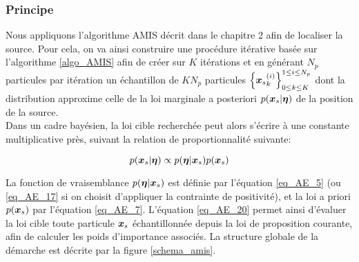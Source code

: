 {\subsubsection{Principe}

Nous appliquons l'algorithme AMIS décrit dans le chapitre 2 afin de localiser la source. Pour cela, on va ainsi construire une procédure itérative basée sur l'algorithme \ref{algo_AMIS} afin de créer sur $K$ itérations et en générant $N_p$ particules par itération un échantillon de $KN_p$ particules {$\left\{{\bm{x}_s}_k^{(i)}\right\}_{0\leq k \leq K}^{1\leq i \leq N_p}$} dont la distribution approxime celle de la loi marginale a posteriori {$p({\bm{x}_s} | {\bm{\eta}})$} de la position de la source.\\

\newpage Dans un cadre bayésien, la loi cible recherchée peut alors s'écrire à une constante multiplicative près, suivant la relation de proportionnalité suivante:

\begin{equation}
{
p({\bm{x}_s}| {\bm{\eta}}) \propto p({\bm{\eta}}| {\bm{x}_s})p({\bm{x}_s})
\label{eq_AE_20}
}
\end{equation}

La fonction de vraisemblance {$p({\bm{\eta}} | {\bm{x}_s})$} est définie par l'équation \eqref{eq_AE_5} (ou \eqref{eq_AE_17} si on choisit d'appliquer la contrainte de positivité), et la loi a priori {$p({\bm{x}_s})$} par l'équation \eqref{eq_AE_7}. L'équation \eqref{eq_AE_20} permet ainsi d'évaluer la loi cible toute particule {${\bm{x}_s}$} échantillonnée depuis la loi de proposition courante, afin de calculer les poids d'importance {associés}. La structure globale de la démarche est décrite par la figure \ref{schema_amis}.\\


}
